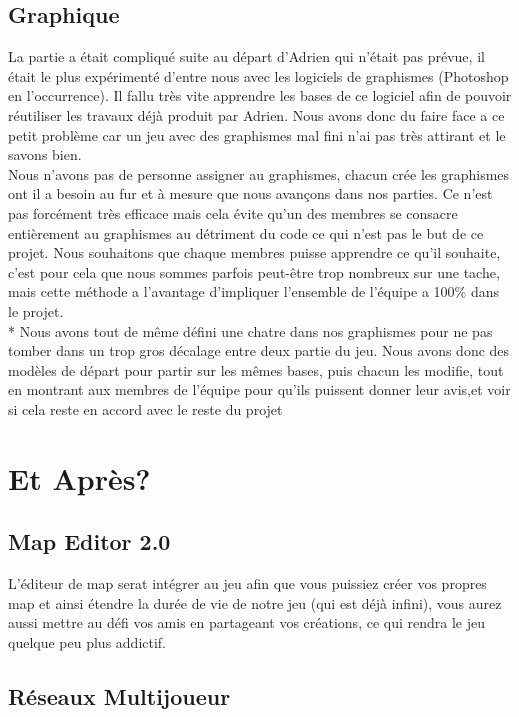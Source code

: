 \documentclass [11pt]{report}
\begin{document}
	\vspace{10mm}
	
	\section{Graphique}
	La partie a était compliqué suite au départ d'Adrien qui n'était pas prévue, il était le plus expérimenté d'entre nous avec les logiciels de graphismes (Photoshop en l'occurrence). Il fallu très vite apprendre les bases de ce logiciel afin de pouvoir réutiliser les travaux déjà produit par Adrien. Nous avons donc du faire face a ce petit problème car un jeu avec des graphismes mal fini n'ai pas très attirant et le savons bien.\\
	\indent Nous n'avons pas de personne assigner au graphismes, chacun crée les graphismes ont il a besoin au fur et à mesure que nous avançons dans nos parties. Ce n'est pas forcément très efficace mais cela évite qu'un des membres se consacre entièrement au graphismes au détriment du code ce qui n'est pas le but de ce projet. Nous souhaitons que chaque membres puisse apprendre ce qu'il souhaite, c'est pour cela que nous sommes parfois peut-être trop nombreux sur une tache, mais cette méthode a l'avantage d'impliquer l'ensemble de l'équipe a 100\% dans le projet.\\*
	\indent Nous avons tout de même défini une chatre dans nos graphismes pour ne pas tomber dans un trop gros décalage entre deux partie du jeu. Nous avons donc des modèles de départ pour partir sur les mêmes bases, puis chacun les modifie, tout en montrant aux membres de l'équipe pour qu'ils puissent donner leur avis,et voir si cela reste en accord avec le reste du projet
	
	
\chapter{Et Après?}
	\section{Map Editor 2.0}
	L'éditeur de map serat intégrer au jeu afin que vous puissiez créer vos propres map et ainsi étendre la durée de vie de notre jeu (qui est déjà infini), vous aurez aussi mettre au défi vos amis en partageant vos créations, ce qui rendra le jeu quelque peu plus addictif.
	
	
	\section{Réseaux Multijoueur}
\end{document}
